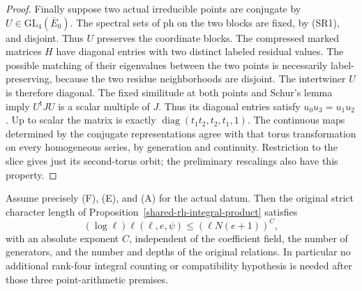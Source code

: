 \begin{proof}
Finally suppose two actual irreducible points are
conjugate by \(U\in\mathrm{GL}_4(\overline E_0)\).
The spectral sets of \(\mathrm{ph}\) on the two
blocks are fixed, by (SR1), and disjoint.
Thus \(U\) preserves the coordinate blocks.
The compressed marked matrices \(H\) have diagonal
entries with two distinct labeled residual values.
The possible matching of their eigenvalues between
the two points is necessarily label-preserving,
because the two residue neighborhoods are disjoint.
The intertwiner \(U\) is therefore diagonal.
The fixed similitude at both points and Schur's
lemma imply \(U^{\mathsf t}JU\) is a scalar multiple
of \(J\). Thus its diagonal entries satisfy
\(u_0u_3=u_1u_2\). Up to scalar the matrix is exactly
\(\operatorname{diag}(t_1t_2,t_2,t_1,1)\).
The continuous maps determined by the conjugate
representations agree with that torus transformation
on every homogeneous series, by generation and
continuity. Restriction to the slice gives just its
second-torus orbit; the preliminary rescalings also
have this property.
\end{proof}

\begin{theorem}
\label{thm:rh-sp4-conditional-length}
Assume precisely (F), (E), and (A) for the actual datum.
Then the original strict character length of
Proposition~\ref{shared-rh-integral-product} satisfies
\[
 (\log\ell)\ell(\ell,e,\psi)
               \le(\ell N(e+1))^{C},                       \tag{SL3}
\]
with an absolute exponent \(C\), independent of the
coefficient field, the number of generators, and the
number and depths of the original relations.
In particular no additional rank-four integral counting
or compatibility hypothesis is needed after those three
point-arithmetic premises.
\end{theorem}

